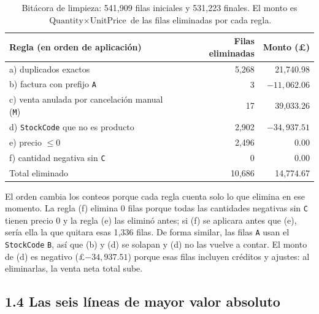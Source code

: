 \documentclass[11pt]{article}
\begin{document}
\begin{table}[H]
\centering
\begin{tabular}{l|r|r}
\hline
Regla (en orden de aplicaci\'on) & Filas eliminadas & Monto (\pounds) \\
\hline
a) duplicados exactos                         & 5{,}268 &  21{,}740.98 \\
b) factura con prefijo \texttt{A}             &       3 & $-11{,}062.06$ \\
c) venta anulada por cancelaci\'on manual (\texttt{M}) &  17 & 39{,}033.26 \\
d) \texttt{StockCode} que no es producto      & 2{,}902 & $-34{,}937.51$ \\
e) precio $\le 0$                             & 2{,}496 &        0.00 \\
f) cantidad negativa sin \texttt{C}           &       0 &        0.00 \\
\hline
Total eliminado                               & 10{,}686 &  14{,}774.67 \\
\hline
\end{tabular}
\caption{Bit\'acora de limpieza: 541{,}909 filas iniciales y 531{,}223
finales. El monto es $\text{Quantity}\times\text{UnitPrice}$ de las filas
eliminadas por cada regla.}
\label{tab:bitacora}
\end{table}

El orden cambia los conteos porque cada regla cuenta solo lo que elimina en
ese momento. La regla (f) elimina 0 filas porque todas las cantidades
negativas sin \texttt{C} tienen precio 0 y la regla (e) las elimin\'o antes;
si (f) se aplicara antes que (e), ser\'ia ella la que quitara esas 1{,}336
filas. De forma similar, las filas \texttt{A} usan el \texttt{StockCode}
\texttt{B}, as\'i que (b) y (d) se solapan y (d) no las vuelve a contar. El
monto de (d) es negativo (\pounds $-34{,}937.51$) porque esas filas incluyen
cr\'editos y ajustes: al eliminarlas, la venta neta total sube.

\subsection*{1.4 Las seis l\'ineas de mayor valor absoluto}
\end{document}
